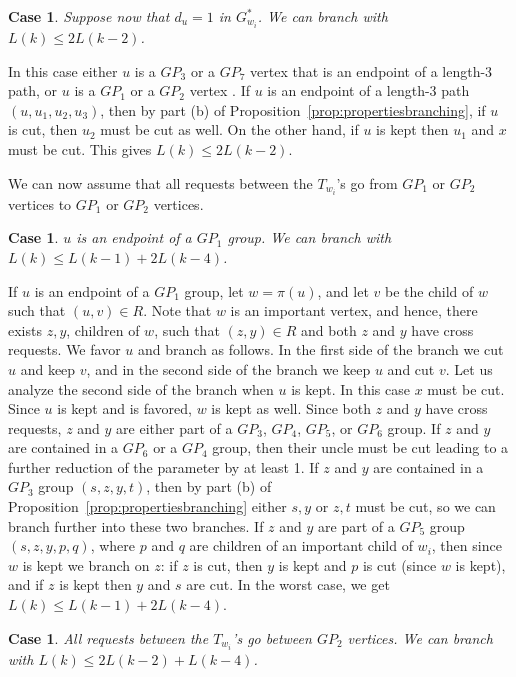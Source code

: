 \documentclass[11pt]{article}
\newtheorem{case}[theorem]{Case}
\begin{document}
\begin{case}
\label{case:400}
Suppose now that $d_u=1$ in $G^*_{w_i}$. We can branch with $L(k) \leq 2L(k-2)$.
\end{case}

In this case either $u$ is a $GP_3$ or a $GP_7$ vertex that is an endpoint of a length-3 path, or $u$ is a $GP_1$ or a $GP_2$ vertex . If $u$ is an endpoint of a length-3 path $(u, u_1, u_2, u_3)$, then by part (b) of Proposition~\ref{prop:propertiesbranching}, if $u$ is cut, then $u_2$ must be cut as well. On the other hand, if $u$ is kept then $u_1$ and $x$ must be cut. This gives $L(k) \leq 2L(k-2)$.

We can now assume that all requests between the $T_{w_i}$'s go from $GP_1$ or $GP_2$ vertices to $GP_1$ or $GP_2$ vertices.

\begin{case}
\label{case:500}
$u$ is an endpoint of a $GP_1$ group. We can branch with $L(k) \leq L(k-1) + 2L(k-4)$.
\end{case}


If $u$ is an endpoint of a $GP_1$ group, let $w=\pi(u)$, and let $v$ be the child of $w$ such that $(u, v) \in R$.  Note that $w$ is an important vertex, and hence, there exists $z, y$, children of $w$, such that $(z, y) \in R$ and both $z$ and $y$ have cross requests. We favor $u$ and branch as follows. In the first side of the branch we cut $u$ and keep $v$, and in the second side of the branch we keep $u$ and cut $v$. Let us analyze the second side of the branch when $u$ is kept. In this case $x$ must be cut. Since $u$ is kept and is favored, $w$ is kept as well. Since both $z$ and $y$ have cross requests, $z$ and $y$ are either part of a $GP_3$, $GP_4$, $GP_5$, or $GP_6$ group. If $z$ and $y$ are contained in a $GP_6$ or a $GP_4$ group, then their uncle must be cut leading to a further reduction of the parameter by at least 1. If $z$ and $y$ are contained in a $GP_3$ group $(s, z, y, t)$, then by part (b) of Proposition~\ref{prop:propertiesbranching} either $s, y$ or $z, t$ must be cut, so we can branch further into these two branches. If $z$ and $y$ are part of a $GP_5$ group $(s, z, y, p, q)$, where $p$ and $q$ are children of an important child of $w_i$, then since $w$ is kept we branch on $z$: if $z$ is cut, then $y$ is kept and $p$ is cut (since $w$ is kept), and if $z$ is kept then $y$ and $s$ are cut. In the worst case, we get $L(k) \leq L(k-1) + 2L(k-4)$.

\begin{case}
\label{case:600}
All requests between the $T_{w_i}$'s go between $GP_2$ vertices. We can branch with $L(k) \leq 2L(k-2) + L(k-4)$.
\end{case}
\end{document}
